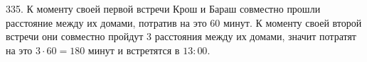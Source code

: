 335. К моменту своей первой встречи Крош и Бараш совместно прошли расстояние между их домами, потратив на это 60 минут. К моменту своей второй встречи они совместно пройдут 3 расстояния между их домами, значит потратят на это $3\cdot60=180$ минут и встретятся в $13:00.$\\
